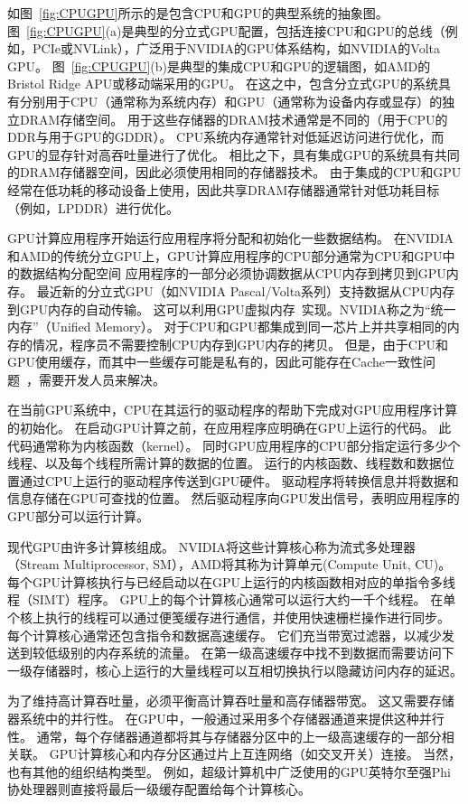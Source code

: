 如图~\ref{fig:CPUGPU}所示的是包含CPU和GPU的典型系统的抽象图。图~\ref{fig:CPUGPU}(a)是典型的分立式GPU配置，包括连接CPU和GPU的总线（例如，PCIe或NVLink），广泛用于NVIDIA的GPU体系结构，如NVIDIA的Volta GPU。
图~\ref{fig:CPUGPU}(b)是典型的集成CPU和GPU的逻辑图，如AMD的Bristol Ridge APU或移动端采用的GPU。
在这之中，包含分立式GPU的系统具有分别用于CPU（通常称为系统内存）和GPU（通常称为设备内存或显存）的独立DRAM存储空间。
用于这些存储器的DRAM技术通常是不同的（用于CPU的DDR与用于GPU的GDDR）。
CPU系统内存通常针对低延迟访问进行优化，而GPU的显存针对高吞吐量进行了优化。
相比之下，具有集成GPU的系统具有共同的DRAM存储器空间，因此必须使用相同的存储器技术。
由于集成的CPU和GPU经常在低功耗的移动设备上使用，因此共享DRAM存储器通常针对低功耗目标（例如，LPDDR）进行优化。

GPU计算应用程序开始运行应用程序将分配和初始化一些数据结构。
在NVIDIA和AMD的传统分立GPU上，GPU计算应用程序的CPU部分通常为CPU和GPU中的数据结构分配空间
应用程序的一部分必须协调数据从CPU内存到拷贝到GPU内存。 
最近新的分立式GPU（如NVIDIA Pascal/Volta系列）支持数据从CPU内存到GPU内存的自动传输。
这可以利用GPU虚拟内存~实现。NVIDIA称之为``统一内存''（Unified Memory）。
对于CPU和GPU都集成到同一芯片上并共享相同的内存的情况，程序员不需要控制CPU内存到GPU内存的拷贝。
但是，由于CPU和GPU使用缓存，而其中一些缓存可能是私有的，因此可能存在Cache一致性问题~，需要开发人员来解决。

在当前GPU系统中，CPU在其运行的驱动程序的帮助下完成对GPU应用程序计算的初始化。
在启动GPU计算之前，在应用程序应明确在GPU上运行的代码。 
此代码通常称为内核函数（kernel）。 
同时GPU应用程序的CPU部分指定运行多少个线程、以及每个线程所需计算的数据的位置。
运行的内核函数、线程数和数据位置通过CPU上运行的驱动程序传送到GPU硬件。 
驱动程序将转换信息并将数据和信息存储在GPU可查找的位置。 
然后驱动程序向GPU发出信号，表明应用程序的GPU部分可以运行计算。

现代GPU由许多计算核组成。 
NVIDIA将这些计算核心称为流式多处理器（Stream Multiprocessor, SM），AMD将其称为计算单元(Compute Unit, CU)。 
每个GPU计算核执行与已经启动以在GPU上运行的内核函数相对应的单指令多线程（SIMT）程序。 
GPU上的每个计算核心通常可以运行大约一千个线程。 
在单个核上执行的线程可以通过便笺缓存进行通信，并使用快速栅栏操作进行同步。 
每个计算核心通常还包含指令和数据高速缓存。 
它们充当带宽过滤器，以减少发送到较低级别的内存系统的流量。 
在第一级高速缓存中找不到数据而需要访问下一级存储器时，核心上运行的大量线程可以互相切换执行以隐藏访问内存的延迟。

为了维持高计算吞吐量，必须平衡高计算吞吐量和高存储器带宽。
这又需要存储器系统中的并行性。
在GPU中，一般通过采用多个存储器通道来提供这种并行性。
通常，每个存储器通道都将其与存储器分区中的上一级高速缓存的一部分相关联。 
GPU计算核心和内存分区通过片上互连网络（如交叉开关）连接。
当然，也有其他的组织结构类型。
例如，超级计算机中广泛使用的GPU英特尔至强Phi协处理器则直接将最后一级缓存配置给每个计算核心。

